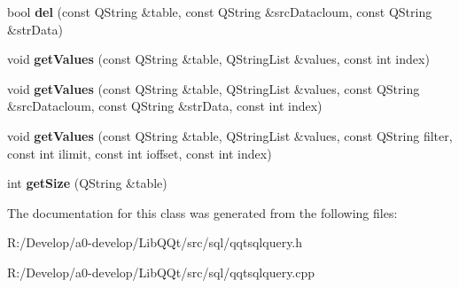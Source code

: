 \begin{DoxyCompactItemize}
\item 
\mbox{\label{class_q_qt_sql_query_a3429cb1bce1c0e44335329c68db6d2f6}} 
bool {\bfseries del} (const Q\+String \&table, const Q\+String \&src\+Datacloum, const Q\+String \&str\+Data)
\item 
\mbox{\label{class_q_qt_sql_query_a1909f7b7ab02361292a4f288c70e1e97}} 
void {\bfseries get\+Values} (const Q\+String \&table, Q\+String\+List \&values, const int index)
\item 
\mbox{\label{class_q_qt_sql_query_a28e202e1b91c5e9120df6085edd3d71a}} 
void {\bfseries get\+Values} (const Q\+String \&table, Q\+String\+List \&values, const Q\+String \&src\+Datacloum, const Q\+String \&str\+Data, const int index)
\item 
\mbox{\label{class_q_qt_sql_query_a238996badcc6d276d610497adb3bbcbb}} 
void {\bfseries get\+Values} (const Q\+String \&table, Q\+String\+List \&values, const Q\+String filter, const int ilimit, const int ioffset, const int index)
\item 
\mbox{\label{class_q_qt_sql_query_a2fac6ab2a7ae556357940b56809c486d}} 
int {\bfseries get\+Size} (Q\+String \&table)
\end{DoxyCompactItemize}


The documentation for this class was generated from the following files\+:\begin{DoxyCompactItemize}
\item 
R\+:/\+Develop/a0-\/develop/\+Lib\+Q\+Qt/src/sql/qqtsqlquery.\+h\item 
R\+:/\+Develop/a0-\/develop/\+Lib\+Q\+Qt/src/sql/qqtsqlquery.\+cpp\end{DoxyCompactItemize}

